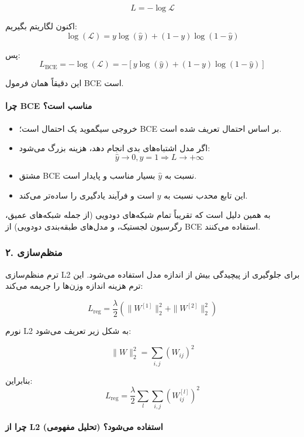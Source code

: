 \documentclass{article}
\begin{document}
\[
L = -\log \mathcal{L}
\]

اکنون لگاریتم بگیریم:
\[
\log(\mathcal{L}) 
= y \log(\hat{y}) + (1-y)\log(1-\hat{y})
\]

پس:
\[
L_{\text{BCE}} = -\log(\mathcal{L}) 
= -\left[ y \log(\hat{y}) + (1-y)\log(1-\hat{y}) \right]
\]

این دقیقاً همان فرمول BCE است.

\paragraph{چرا BCE مناسب است؟}

\begin{itemize}
	\item خروجی سیگموید یک احتمال است؛ BCE بر اساس احتمال تعریف شده است.
	\item اگر مدل اشتباه‌های بدی انجام دهد، هزینه بزرگ می‌شود:
	\[
	\hat{y} \to 0, y=1 \Rightarrow L \to +\infty
	\]
	\item مشتق BCE نسبت به \(\hat{y}\) بسیار مناسب و پایدار است.
	\item این تابع محدب نسبت به \(\hat{y}\) است و فرآیند یادگیری را ساده‌تر می‌کند.
\end{itemize}

به همین دلیل است که تقریباً تمام شبکه‌های دودویی (از جمله شبکه‌های عمیق، رگرسیون لجستیک، و مدل‌های طبقه‌بندی دودویی) از BCE استفاده می‌کنند.

\subsubsection*{۲. منظم‌سازی }

ترم منظم‌سازی L2 برای جلوگیری از پیچیدگی بیش از اندازه مدل استفاده می‌شود.  
این ترم هزینه اندازه وزن‌ها را جریمه می‌کند:

\[
L_{\text{reg}} = \frac{\lambda}{2}
\left( \|W^{[1]}\|_2^2 + \|W^{[2]}\|_2^2 \right)
\]

نورم L2 به شکل زیر تعریف می‌شود:

\[
\|W\|_2^2 = \sum_{i,j} (W_{ij})^2
\]

بنابراین:
\[
L_{\text{reg}} = \frac{\lambda}{2} \sum_{l} \sum_{i,j} (W_{ij}^{[l]})^2
\]

\paragraph{چرا از L2 استفاده می‌شود؟ (تحلیل مفهومی)}
\end{document}
